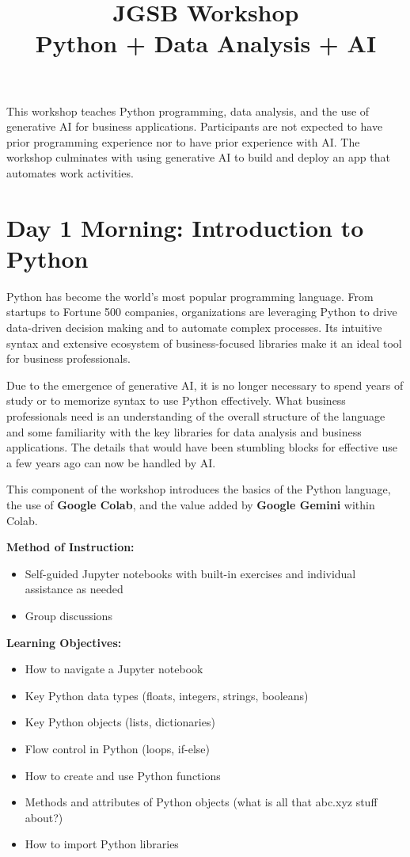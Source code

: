 \documentclass[11pt]{scrartcl}
\title{\textbf{JGSB Workshop \\ Python + Data Analysis + AI}}
\author{}
\date{}
\begin{document}
\maketitle

This workshop teaches Python programming, data analysis, and the use of generative AI for business applications. Participants are not expected to have prior programming experience nor to have prior experience with AI. The workshop culminates with using generative AI to build and deploy an app that automates work activities.

\section*{Day 1 Morning: Introduction to Python}

Python has become the world's most popular programming language. From startups to Fortune 500 companies, organizations are leveraging Python to drive data-driven decision making and to automate complex processes. Its intuitive syntax and extensive ecosystem of business-focused libraries make it an ideal tool for business professionals.

Due to the emergence of generative AI, it is no longer necessary to spend years of study or to memorize syntax to use Python effectively. What business professionals need is an understanding of the overall structure of the language and some familiarity with the key libraries for data analysis and business applications. The details that would have been stumbling blocks for effective use a few years ago can now be handled by AI.

This component of the workshop introduces the basics of the Python language, the use of \textbf{Google Colab}, and the value added by \textbf{Google Gemini} within Colab.

\vspace{\baselineskip}
\noindent\textbf{Method of Instruction:}

\begin{itemize}
\item Self-guided Jupyter notebooks with built-in exercises and individual assistance as needed
\item Group discussions
\end{itemize}

\noindent\textbf{Learning Objectives:}

\begin{itemize}
\item How to navigate a Jupyter notebook
\item Key Python data types (floats, integers, strings, booleans)
\item Key Python objects (lists, dictionaries)
\item Flow control in Python (loops, if-else)
\item How to create and use Python functions
\item Methods and attributes of Python objects (what is all that abc.xyz stuff about?)
\item How to import Python libraries
\end{itemize}
\end{document}
